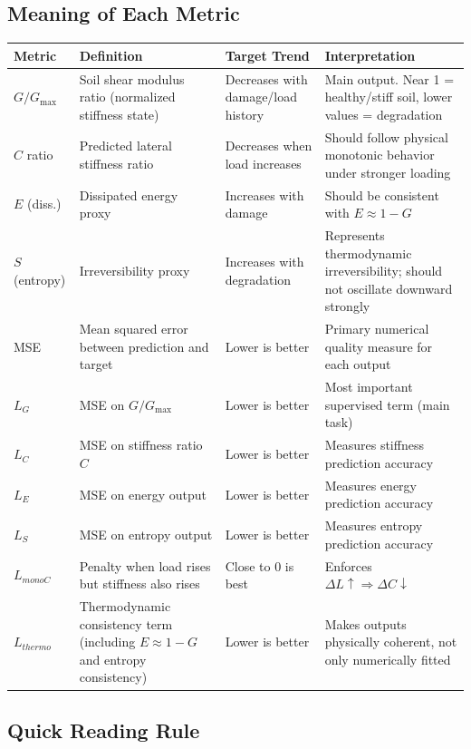 \documentclass[12pt,a4paper]{article}
\begin{document}
\subsection{Meaning of Each Metric}

\renewcommand{\arraystretch}{1.25}
\begin{tabular}{|p{2.0cm}|p{4.6cm}|p{3.4cm}|p{4.0cm}|}
\hline
\textbf{Metric} & \textbf{Definition} & \textbf{Target Trend} & \textbf{Interpretation} \\
\hline
$G/G_{\max}$ & Soil shear modulus ratio (normalized stiffness state) & Decreases with damage/load history & Main output. Near 1 = healthy/stiff soil, lower values = degradation \\
\hline
$C$ ratio & Predicted lateral stiffness ratio & Decreases when load increases & Should follow physical monotonic behavior under stronger loading \\
\hline
$E$ (diss.) & Dissipated energy proxy & Increases with damage & Should be consistent with $E \approx 1-G$ \\
\hline
$S$ (entropy) & Irreversibility proxy & Increases with degradation & Represents thermodynamic irreversibility; should not oscillate downward strongly \\
\hline
MSE & Mean squared error between prediction and target & Lower is better & Primary numerical quality measure for each output \\
\hline
$L_G$ & MSE on $G/G_{\max}$ & Lower is better & Most important supervised term (main task) \\
\hline
$L_C$ & MSE on stiffness ratio $C$ & Lower is better & Measures stiffness prediction accuracy \\
\hline
$L_E$ & MSE on energy output & Lower is better & Measures energy prediction accuracy \\
\hline
$L_S$ & MSE on entropy output & Lower is better & Measures entropy prediction accuracy \\
\hline
$L_{monoC}$ & Penalty when load rises but stiffness also rises & Close to 0 is best & Enforces $\Delta L\uparrow \Rightarrow \Delta C\downarrow$ \\
\hline
$L_{thermo}$ & Thermodynamic consistency term (including $E\approx1-G$ and entropy consistency) & Lower is better & Makes outputs physically coherent, not only numerically fitted \\
\hline
\end{tabular}

\subsection{Quick Reading Rule}
\end{document}
